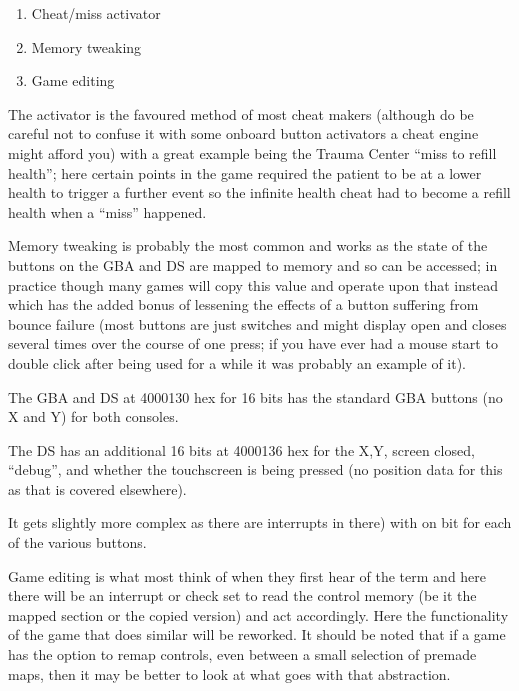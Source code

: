 \documentclass[
]{book}
\providecommand{\tightlist}{%
  \setlength{\itemsep}{0pt}\setlength{\parskip}{0pt}}
\begin{document}
\begin{enumerate}
\def\labelenumi{\arabic{enumi}.}
\tightlist
\item
  Cheat/miss activator
\item
  Memory tweaking
\item
  Game editing
\end{enumerate}

The activator is the favoured method of most cheat makers (although do be careful not to confuse it with some onboard button activators a cheat engine might afford you) with a great example being the Trauma Center ``miss to refill health''; here certain points in the game required the patient to be at a lower health to trigger a further event so the infinite health cheat had to become a refill health when a ``miss'' happened.

Memory tweaking is probably the most common and works as the state of the buttons on the GBA and DS are mapped to memory and so can be accessed; in practice though many games will copy this value and operate upon that instead which has the added bonus of lessening the effects of a button suffering from bounce failure (most buttons are just switches and might display open and closes several times over the course of one press; if you have ever had a mouse start to double click after being used for a while it was probably an example of it).

The GBA and DS at 4000130 hex for 16 bits has the standard GBA buttons (no X and Y) for both consoles.

The DS has an additional 16 bits at 4000136 hex for the X,Y, screen closed, ``debug'', and whether the touchscreen is being pressed (no position data for this as that is covered elsewhere).

It gets slightly more complex as there are interrupts in there) with on bit for each of the various buttons.

Game editing is what most think of when they first hear of the term and here there will be an interrupt or check set to read the control memory (be it the mapped section or the copied version) and act accordingly. Here the functionality of the game that does similar will be reworked. It should be noted that if a game has the option to remap controls, even between a small selection of premade maps, then it may be better to look at what goes with that abstraction.
\end{document}
